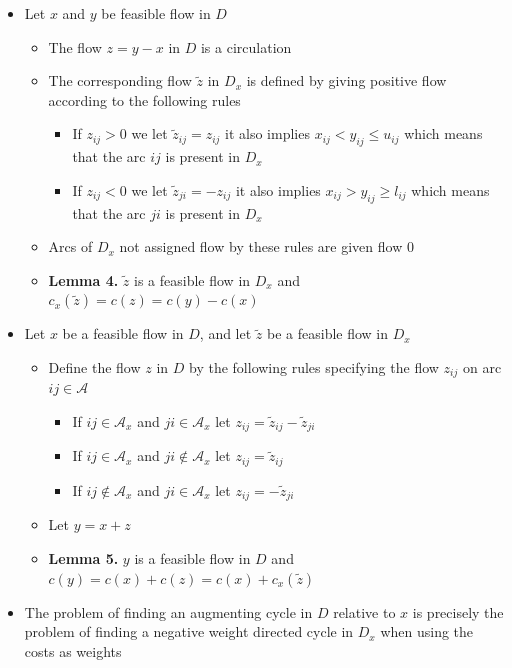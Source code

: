 \documentclass[11pt]{article}
\begin{document}
\begin{enumerate}
\begin{itemize}
\item Let \(x\) and \(y\) be feasible flow in \(D\)
\begin{itemize}
\item The flow \(z = y-x\) in \(D\) is a circulation
\item The corresponding flow \(\tilde z\) in \(D_x\) is defined by giving positive flow according to the following rules
\begin{itemize}
\item If \(z_{ij} > 0\) we let \(\tilde z_{ij} = z_{ij}\) it also implies \(x_{ij} < y_{ij} \leq u_{ij}\) which means that the arc \(ij\) is present in \(D_x\)
\item If \(z_{ij} < 0\) we let \(\tilde z_{ji} = -z_{ij}\) it also implies \(x_{ij} > y_{ij} \geq l_{ij}\) which means that the arc \(ji\) is present in \(D_x\)
\end{itemize}
\item Arcs of \(D_x\) not assigned flow by these rules are given flow \(0\)
\item \textbf{Lemma 4.} \(\tilde z\) is a feasible flow in \(D_x\) and \(c_x(\tilde z) = c(z) = c(y) - c(x)\)
\end{itemize}

\item Let \(x\) be a feasible flow in \(D\), and let \(\tilde z\) be a feasible flow in \(D_x\)
\begin{itemize}
\item Define the flow \(z\) in \(D\) by the following rules specifying the flow \(z_{ij}\) on arc \(ij \in \mathcal A\)
\begin{itemize}
\item If \(ij \in \mathcal A_x\) and \(ji \in \mathcal A_x\) let \(z_{ij} = \tilde z_{ij} - \tilde z_{ji}\)
\item If \(ij \in \mathcal A_x\) and \(ji \notin \mathcal A_x\) let \(z_{ij} = \tilde z_{ij}\)
\item If \(ij \notin \mathcal A_x\) and \(ji \in \mathcal A_x\) let \(z_{ij} =  - \tilde z_{ji}\)
\end{itemize}
\item Let \(y = x+z\)
\item \textbf{Lemma 5.} \(y\) is a feasible flow in \(D\) and \(c(y) = c(x) + c(z) = c(x) + c_x (\tilde z)\)
\end{itemize}

\item The problem of finding an augmenting cycle in \(D\) relative to \(x\) is precisely the problem of finding a negative weight directed cycle in \(D_x\) when using the costs as weights
\end{itemize}


\end{enumerate}
\end{document}
